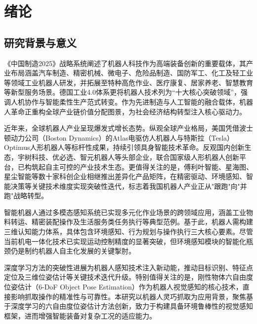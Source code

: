\chapter{绪论}

\section{研究背景与意义}
《中国制造2025》\cite{中国制造2025}战略系统阐述了机器人科技作为高端装备创新的重要载体，其产业布局涵盖汽车制造、精密机械、微电子、危险品制造、国防军工、化工及轻工业等领域工业机器人研发，并拓展至特种高危作业、医疗康复、居家养老、智慧教育等新型服务场景。德国工业4.0\cite{德国工业4.0}体系更将机器人技术列为“十大核心突破领域”，强调人机协作与智能柔性生产范式转变。作为先进制造与人工智能的融合载体，机器人革命正重构全球产业链价值分配图景，为社会经济结构转型注入核心驱动力。

近年来，全球机器人产业呈现爆发式增长态势\cite{2022中国智能机器人行业研究报告}。纵观全球产业格局，美国凭借波士顿动力公司（Boston Dynamics）的Atlas电驱仿人机器人\cite{bostondynamics}与特斯拉（Tesla）Optimus人形机器人\cite{optimus_wikipedia}等标杆性成果，持续引领具身智能技术革命。反观国内创新生态，宇树科技、优必选、智元机器人等头部企业，联合国家级人形机器人创新平台，已构筑起自主可控的产业技术生态。更值得关注的是，傅利叶智能、星海图、星尘智能等数十家科创企业相继推出差异化产品矩阵，在精密驱动、环境感知、智能决策等关键技术维度实现突破性迭代，标志着我国机器人产业正从"跟跑"向"并跑"战略转型。

智能机器人通过多模态感知系统已实现多元化作业场景的跨领域应用，涵盖工业物料转运\cite{bostondynamics_box}、精密装配操作\cite{stoegerautomation_spatz}及生活服务类任务执行\cite{xtech_robot}等典型范例。基于此，机器人需构建三维认知能力体系，具体包含环境感知、行为规划与操作执行三大核心要素\cite{蔡自兴2000机器人学}。尽管当前机电一体化技术已实现运动控制精度的显著突破\cite{doi:10.1177/02783649241285161}，但环境感知模块的智能化瓶颈仍是制约机器人自主化发展的关键掣肘\cite{doi:10.1126/scirobotics.adw1608}。

深度学习方法\cite{lecun2015deep}的突破性进展为机器人感知技术注入新动能，推动目标识别\cite{objectDetectionSurvey}、特征点定位\cite{keypointSurvey}及三维位姿估计\cite{poseEstimationSurvey}等关键技术迭代升级。特别值得关注的是，刚性物体六自由度位姿估计（6-DoF Object Pose Estimation）作为机器人视觉感知的核心技术，直接影响抓取操作的精准性与可靠性。本研究以机器人灵巧抓取为应用背景，聚焦基于深度学习的六自由度位姿估计方法创新，致力于构建具备环境鲁棒性的视觉感知框架，进而增强智能装备对复杂工况的适应能力。

